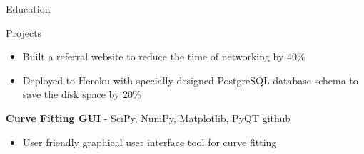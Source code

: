 \documentclass{resume}
\begin{document}
\begin{rSection}{Education}
\begin{rSection}{Projects}
        \begin{itemize}
        \itemsep -3pt {}
        \item Built a referral website to reduce the time of networking by 40\%
        \item Deployed to Heroku with specially designed PostgreSQL database schema to save the disk space by 20\%
        \end{itemize}
    \item \textbf{Curve Fitting GUI} - {SciPy, NumPy, Matplotlib, PyQT} \hfill {\href{https://github.com/noctildon/curve_fitting}{github}}
        \begin{itemize}
        \itemsep -3pt {}
        \item User friendly graphical user interface tool for curve fitting
        \end{itemize}
\end{rSection}




\end{rSection}
\end{document}
